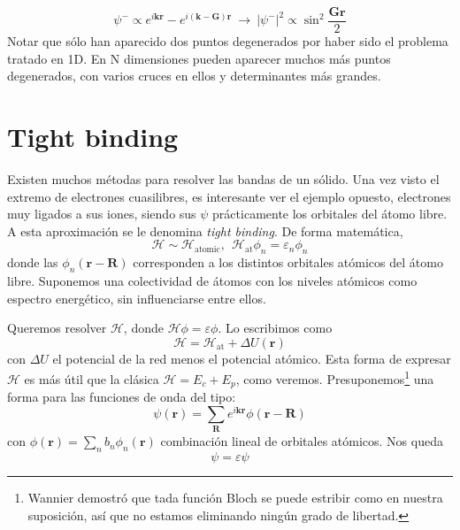 \begin{equation}
  \psi^- \propto e^{i \mathbf{k}\mathbf{r}} - e^{i
    (\mathbf{k}-\mathbf{G}) \mathbf{r}} \ \rightarrow \ |\psi^-|^2
  \propto \sin^2 \frac{\mathbf{G}\mathbf{r}}{2} \tag{P wave}
\end{equation}
Notar que sólo han aparecido dos puntos degenerados por haber sido el
problema tratado en 1D. En N dimensiones pueden aparecer muchos más
puntos degenerados, con varios cruces en ellos y determinantes más grandes.

\section{Tight binding}
Existen muchos métodas para resolver las bandas de un sólido. Una vez
visto el extremo de electrones cuasilibres, es interesante ver el
ejemplo opuesto, electrones muy ligados a sus iones, siendo sus $\psi$
prácticamente los orbitales del átomo libre. A esta aproximación se le
denomina \emph{tight binding}. De forma matemática,
\begin{equation}
  \mathcal{H} \sim \mathcal{H}_\text{atomic}, \ \
  \mathcal{H}_\text{at} \phi_n = \varepsilon_n \phi_n
\end{equation}
donde las $\phi_n (\mathbf{r}-\mathbf{R})$ corresponden a los distintos orbitales atómicos del
átomo libre. Suponemos una colectividad de átomos con los niveles
atómicos como espectro energético, sin influenciarse entre ellos.

Queremos resolver $\mathcal{H}$, donde $\mathcal{H} \phi = \varepsilon
\phi$. Lo escribimos como
\begin{equation}
  \mathcal{H} = \mathcal{H}_\text{at} + \Delta U(\mathbf{r})
\end{equation}
con $\Delta U$ el potencial de la red menos el potencial atómico. Esta
forma de expresar $\mathcal{H}$ es más útil que la clásica
$\mathcal{H} = E_c + E_p$, como veremos. Presuponemos\footnote{Wannier
  demostró que tada función Bloch se puede estribir como en nuestra
  suposición, así que no estamos eliminando ningún grado de libertad.} una forma para
las funciones de onda del tipo:
\begin{equation}
  \psi(\mathbf{r}) = \sum_{\mathbf{R}} e^{i \mathbf{k} \mathbf{r} } \phi(\mathbf{r}-\mathbf{R})
\end{equation}
con $\phi(\mathbf{r}) = \sum_{n} b_n \phi_n(\mathbf{r})$ combinación
lineal de orbitales atómicos. Nos queda
\begin{equation}
  [\mathcal{H}_\text{at} + \Delta U(\mathbf{r})] \psi = \varepsilon \psi
\end{equation}

